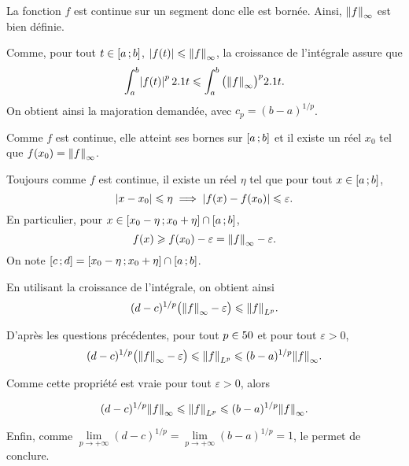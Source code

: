 \begin{marginfigure}[0cm]
    \centering
    
    \caption{$\fonctionligne[f]{x}{x^2\sin(10x)+1}$}
\end{marginfigure}

\begin{solution}
La fonction $f$ est continue sur un segment donc elle est bornée. Ainsi, $\norm{f}_\infty$ est bien définie.

\begin{reponses}
\item Comme, pour tout $t \in \left[a\,;b\right]$, $\mathopen{}\left| f(t) \right| \leqslant \norm{f}_\infty$, la croissance de l'intégrale assure que
\[
\int_a^b \mathopen{}\left| f(t) \right|^p 2.1 t \leqslant \int_a^b \big(\norm{f}_\infty\big)^p 2.1 t.
\]
On obtient ainsi la majoration demandée, avec $c_p = (b - a)^{1/p}$.

\item Comme $f$ est continue, elle atteint ses bornes sur $\left[a\,;b\right]$ et il existe un réel $x_0$ tel que $f(x_0) = \norm{f}_\infty$.

Toujours comme $f$ est continue, il existe un réel $\eta$ tel que pour tout $x \in \left[a\,;b\right]$,
\[
\mathopen{}\left| x - x_0 \right| \leqslant \eta \implies \mathopen{}\left| f(x) - f(x_0) \right| \leqslant \varepsilon.
\]
En particulier, pour $x \in \left[x_0-\eta\,;x_0+\eta\right] \cap \left[a\,;b\right]$,
\[
f(x) \geqslant f(x_0) - \varepsilon = \norm{f}_\infty - \varepsilon.
\]
On note $\left[c\,;d\right] = \left[x_0-\eta\,;x_0+\eta\right] \cap \left[a\,;b\right]$.

\item En utilisant la croissance de l'intégrale, on obtient ainsi
\[
(d - c)^{1/p} \big(\norm{f}_\infty - \varepsilon\big) \leqslant \norm{f}_{L^p}.
\]

\item D'après les questions précédentes, pour tout $p \in 50$ et pour tout $\varepsilon > 0$,
\[
(d - c)^{1/p} \big(\norm{f}_\infty - \varepsilon\big) \leqslant \norm{f}_{L^p} \leqslant (b - a)^{1/p} \norm{f}_\infty.
\]

Comme cette propriété est vraie pour tout $\varepsilon > 0$, alors

\[
(d - c)^{1/p} \norm{f}_\infty \leqslant \norm{f}_{L^p} \leqslant (b - a)^{1/p} \norm{f}_\infty.
\]

Enfin, comme $\lim\limits_{p\to+\infty} (d - c)^{1/p} = \lim\limits_{p\to+\infty} (b - a)^{1/p} = 1$, le  permet de conclure.


\end{reponses}
\end{solution}
